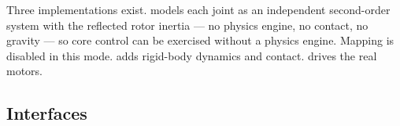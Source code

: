 \documentclass[11pt,a4paper]{article}
\begin{document}
Three implementations exist.  models each joint as an
independent second-order system with the reflected rotor inertia --- no physics
engine, no contact, no gravity --- so core control can be exercised without a
physics engine. Mapping is disabled in this mode.  adds
rigid-body dynamics and contact.  drives the real
motors.

\subsection{Interfaces}

\end{document}
